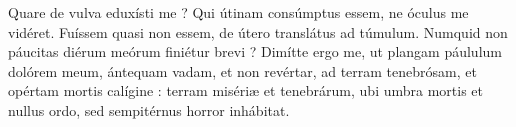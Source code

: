 
Quare de vulva eduxísti me ? Qui útinam consúmptus essem, ne óculus me vidéret.
Fuíssem quasi non essem, de útero translátus ad túmulum.
Numquid non páucitas diérum meórum finiétur brevi ? Dimítte ergo me, ut plangam páululum dolórem meum,
ántequam vadam, et non revértar, ad terram tenebrósam, et opértam mortis calígine :
terram misériæ et tenebrárum, ubi umbra mortis et nullus ordo, sed sempitérnus horror inhábitat.